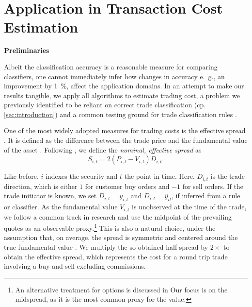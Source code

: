 \clearpage

\section{Application in Transaction Cost Estimation}\label{sec:application}

\textbf{Preliminaries}

Albeit the classification accuracy is a reasonable measure for comparing classifiers, one cannot immediately infer how changes in accuracy e.~g., an improvement by \SI{1}{\percent}, affect the application domains. In an attempt to make our results tangible, we apply all algorithms to estimate trading cost, a problem we previously identified to be reliant on correct trade classification (cp. \cref{sec:introduction}) and a common testing ground for trade classification rules \autocites[cp.][540--541]{ellisAccuracyTradeClassification2000}[][569--570]{finucaneDirectTestMethods2000}[][271--278]{petersonEvaluationBiasesExecution2003}[][896--897]{savickasInferringDirectionOption2003}.

One of the most widely adopted measures for trading costs is the effective spread \autocite[][112]{Piwowar_2006}. It is defined as the difference between the trade price and the fundamental value of the asset \autocite[][238--239]{bessembinderIssuesAssessingTrade2003}. Following \textcite[][238--239]{bessembinderIssuesAssessingTrade2003}, we define the \emph{nominal, effective spread} as
\begin{equation}
    S_{i,t} = 2 (P_{i,t} - V_{i,t}) D_{i,t}.
    \label{eq:effective-spread}
\end{equation}

Like before, $i$ indexes the security and $t$ the point in time. Here, $D_{i,t}$ is the trade direction, which is either $1$ for customer buy orders and $-1$ for sell orders. If the trade initiator is known, we set $D_{i,t} = y_{i,t}$ and $D_{i,t}=\hat{y}_{it}$, if inferred from a rule or classifier. As the fundamental value $V_{i,t}$ is unobserved at the time of the trade, we follow a common track in research and use the midpoint of the prevailing quotes as an observable proxy.\footnote{An alternative treatment for options is discussed in \textcite[][4975--4976]{muravyevOptionsTradingCosts2020} Our focus is on the midspread, as it is the most common proxy for the value.} This is also a natural choice, under the assumption that, on average, the spread is symmetric and centered around the true fundamental value \autocite[][1018]{leeMarketIntegrationPrice1993}. We multiply the so-obtained half-spread by $2 \times$ to obtain the effective spread, which represents the cost for a round trip trade involving a buy and sell excluding commissions.

